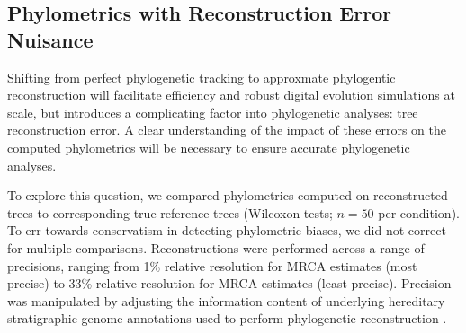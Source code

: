 





\subsection{Phylometrics with Reconstruction Error Nuisance}

Shifting from perfect phylogenetic tracking to approxmate phylogentic reconstruction will facilitate efficiency and robust digital evolution simulations at scale, but introduces a complicating factor into phylogenetic analyses: tree reconstruction error.
A clear understanding of the impact of these errors on the computed phylometrics will be necessary to ensure accurate phylogenetic analyses.

To explore this question, we compared phylometrics computed on reconstructed trees to corresponding true reference trees (Wilcoxon tests; $n=50$ per condition).
To err towards conservatism in detecting phylometric biases, we did not correct for multiple comparisons.
Reconstructions were performed across a range of precisions, ranging from 1\% relative resolution for MRCA estimates (most precise) to 33\% relative resolution for MRCA estimates (least precise).
Precision was manipulated by adjusting the information content of underlying hereditary stratigraphic genome annotations used to perform phylogenetic reconstruction \citep{moreno2022hereditary}.

